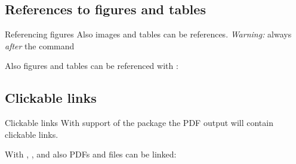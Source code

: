 \subsection{References to figures and tables}
\begin{frame}
	\begin{block}{Referencing figures}
		Also images and tables can be references. \emph{Warning:} 
		 always \emph{after} the  command
	\end{block}
\end{frame}
\begin{frame}
	Also figures and tables can be referenced with :
\end{frame}

\subsection{Clickable links}
\begin{frame}
	\begin{block}{Clickable links}
		With support of the  package the PDF output will contain
		clickable links.
	\end{block}
\end{frame}
\begin{frame}
\end{frame}
\begin{frame}
	With , , and  also PDFs and files can be linked:
\end{frame}
